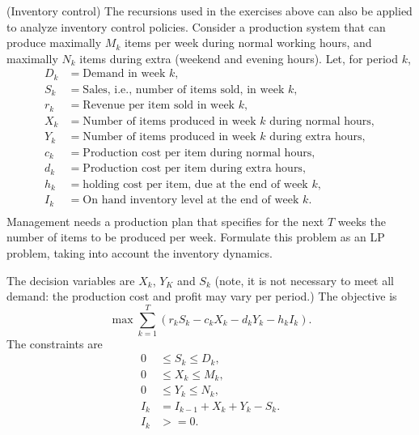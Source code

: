 \begin{question}(Inventory control) The recursions used in the
  exercises above can also be applied to analyze inventory control
  policies. Consider a production system that can produce maximally
  $M_k$ items per week during normal working hours, and maximally
  $N_k$ items during extra (weekend and evening hours). Let, for
  period $k$,
  \begin{align*}
    D_k &= \text{Demand in  week $k$}, \\
    S_k &= \text{Sales, i.e., number of items sold, in week $k$}, \\
    r_k &= \text{Revenue per item sold in week $k$}, \\
    X_k &= \text{Number of items produced in week $k$  during normal hours}, \\
    Y_k &= \text{Number of items produced in week $k$ during extra  hours}, \\
    c_k &= \text{Production cost per item during normal  hours}, \\
    d_k &= \text{Production cost per item during extra  hours}, \\
    h_k &= \text{holding cost per  item, due at the end of week $k$}, \\
    I_k &= \text{On hand inventory level at the end of week $k$}. \\
  \end{align*}
  Management needs a production plan that specifies for the next $T$
  weeks the number of items to be produced per week. Formulate this
  problem as an LP problem, taking into account the inventory
  dynamics.  


  \begin{solution}
    The decision variables are $X_k$, $Y_K$ and $S_k$ (note, it is not
    necessary to meet all demand:  the production cost and profit
    may vary per period.)  The objective is 
    \begin{equation*}
      \max \sum_{k=1}^T (r_kS_k -c_k X_k - d_k Y_k - h_k I_k).
    \end{equation*}
The constraints are 
\begin{align*}
  0&\leq S_k \leq D_k, \\
  0&\leq X_k \leq M_k, \\
  0&\leq Y_k \leq N_k, \\
  I_k&=I_{k-1}+X_k+Y_k - S_k. \\
I_k &>= 0.
\end{align*}
  \end{solution}
\end{question}


